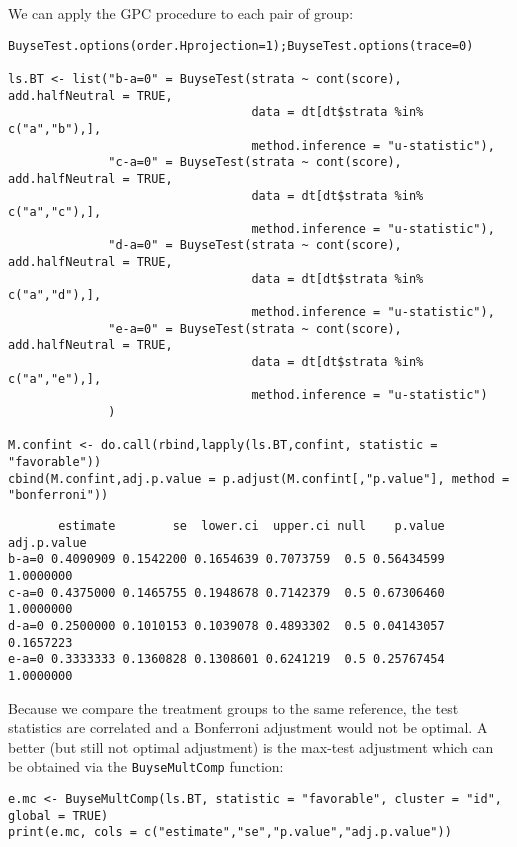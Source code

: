 \documentclass[12pt]{article}
\begin{document}
\clearpage

We can apply the GPC procedure to each pair of group:
\lstset{language=r,label= ,caption= ,captionpos=b,numbers=none}
\begin{lstlisting}
BuyseTest.options(order.Hprojection=1);BuyseTest.options(trace=0)

ls.BT <- list("b-a=0" = BuyseTest(strata ~ cont(score), add.halfNeutral = TRUE,
                                  data = dt[dt$strata %in% c("a","b"),],
                                  method.inference = "u-statistic"),
              "c-a=0" = BuyseTest(strata ~ cont(score), add.halfNeutral = TRUE,
                                  data = dt[dt$strata %in% c("a","c"),],
                                  method.inference = "u-statistic"),
              "d-a=0" = BuyseTest(strata ~ cont(score), add.halfNeutral = TRUE,
                                  data = dt[dt$strata %in% c("a","d"),],
                                  method.inference = "u-statistic"),
              "e-a=0" = BuyseTest(strata ~ cont(score), add.halfNeutral = TRUE,
                                  data = dt[dt$strata %in% c("a","e"),],
                                  method.inference = "u-statistic")
              )

M.confint <- do.call(rbind,lapply(ls.BT,confint, statistic = "favorable"))
cbind(M.confint,adj.p.value = p.adjust(M.confint[,"p.value"], method = "bonferroni"))
\end{lstlisting}

\begin{verbatim}
       estimate        se  lower.ci  upper.ci null    p.value adj.p.value
b-a=0 0.4090909 0.1542200 0.1654639 0.7073759  0.5 0.56434599   1.0000000
c-a=0 0.4375000 0.1465755 0.1948678 0.7142379  0.5 0.67306460   1.0000000
d-a=0 0.2500000 0.1010153 0.1039078 0.4893302  0.5 0.04143057   0.1657223
e-a=0 0.3333333 0.1360828 0.1308601 0.6241219  0.5 0.25767454   1.0000000
\end{verbatim}



Because we compare the treatment groups to the same reference, the
test statistics are correlated and a Bonferroni adjustment would not
be optimal. A better (but still not optimal adjustment) is the
max-test adjustment which can be obtained via the \texttt{BuyseMultComp} function:
\lstset{language=r,label= ,caption= ,captionpos=b,numbers=none}
\begin{lstlisting}
e.mc <- BuyseMultComp(ls.BT, statistic = "favorable", cluster = "id", global = TRUE)
print(e.mc, cols = c("estimate","se","p.value","adj.p.value"))
\end{lstlisting}
\end{document}
